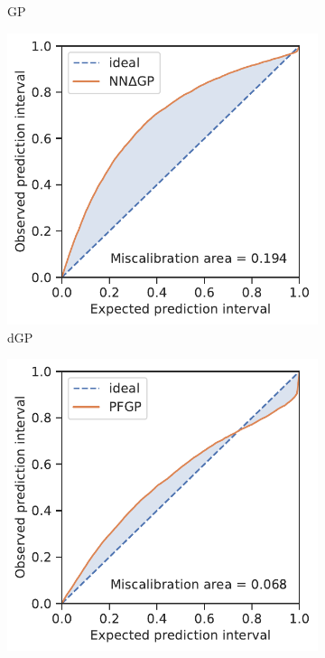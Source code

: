 \documentclass[]{achemso}
\begin{document}
\begin{figure}
\begin{subfigure}{0.32\textwidth}
        \caption{\gls{GP}}\label{fig:calibration_gp}
    \end{subfigure}
    \begin{subfigure}{0.32\textwidth}
        \includegraphics[width=\textwidth]{../NNdGP/Matern/calibration.pdf}
        \caption{\gls{dGP}}\label{fig:calibration_dgp}
    \end{subfigure}
    \begin{subfigure}{0.32\textwidth}
        \includegraphics[width=\textwidth]{../PFGP/Matern/calibration.pdf}

\end{subfigure}
\end{figure}
\end{document}
